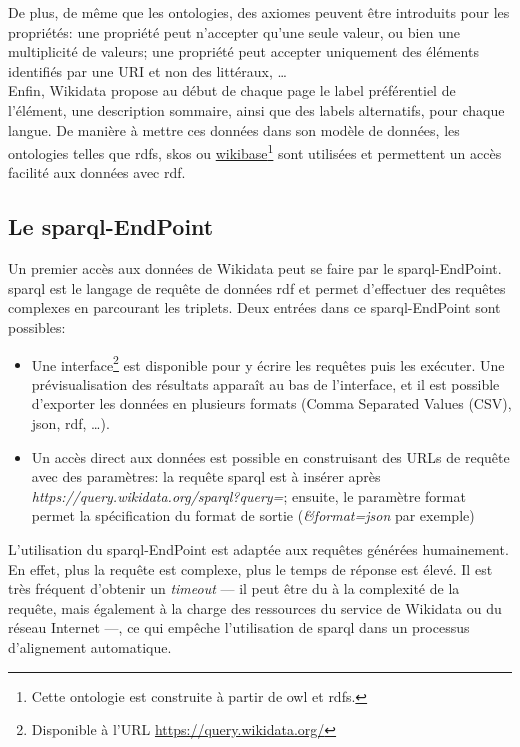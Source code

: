 De plus, de même que les ontologies, des axiomes peuvent être introduits pour les propriétés: une propriété peut n'accepter qu'une seule valeur, ou bien une multiplicité de valeurs; une propriété peut accepter uniquement des éléments identifiés par une URI et non des littéraux, \dots~\\

Enfin, Wikidata propose au début de chaque page le label préférentiel de l'élément, une description sommaire, ainsi que des labels alternatifs, pour chaque langue. De manière à mettre ces données dans son modèle de données, les ontologies telles que \ac{rdfs}, \ac{skos} ou \href{http://wikiba.se/ontology#}{wikibase}\footnote{Cette ontologie est construite à partir de \ac{owl} et \ac{rdfs}.} sont utilisées et permettent un accès facilité aux données avec \ac{rdf}.

\subsection{\label{II-C-1-b}Le \ac{sparql}-EndPoint}

Un premier accès aux données de Wikidata peut se faire par le \ac{sparql}-EndPoint. \ac{sparql} est le langage de requête de données \ac{rdf} et permet d'effectuer des requêtes complexes en parcourant les triplets. Deux entrées dans ce \ac{sparql}-EndPoint sont possibles:
\begin{itemize}
	\item Une interface\footnote{Disponible à l'URL \url{https://query.wikidata.org/}} est disponible pour y écrire les requêtes puis les exécuter. Une prévisualisation des résultats apparaît au bas de l'interface, et il est possible d'exporter les données en plusieurs formats (Comma Separated Values (CSV), \ac{json}, \ac{rdf}, \dots).
	\item Un accès direct aux données est possible en construisant des URLs de requête avec des paramètres: la requête \ac{sparql} est à insérer après \textit{https://query.wikidata.org/sparql?query=}; ensuite, le paramètre \og format\fg{} permet la spécification du format de sortie (\textit{\&format=json} par exemple)
\end{itemize}
\medskip

L'utilisation du \ac{sparql}-EndPoint est adaptée aux requêtes générées humainement. En effet, plus la requête est complexe, plus le temps de réponse est élevé. Il est très fréquent d'obtenir un \textit{timeout} --- il peut être du à la complexité de la requête, mais également à la charge des ressources du service de Wikidata ou du réseau Internet ---, ce qui empêche l'utilisation de \ac{sparql} dans un processus d'alignement automatique.\\


